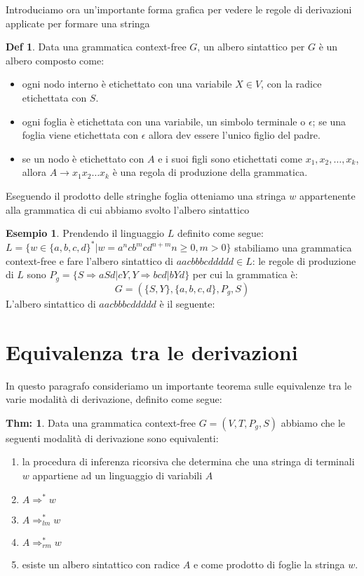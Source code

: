 \documentclass[a4paper]{report}
\theoremstyle{definition}%
\newtheorem*{defi}{Def}%
\newtheorem{thm}{Thm:}[chapter]
\newtheorem*{esempio}{Esempio}
\begin{document}
  Introduciamo ora un'importante forma grafica per vedere le regole di derivazioni applicate per formare una stringa
  \begin{defi}
    Data una grammatica context-free $G$, un albero sintattico per $G$ è un albero composto come:
    \begin{itemize}
       \item ogni nodo interno è etichettato con una variabile $X \in V$, con la radice etichettata con $S$.
       \item ogni foglia è etichettata con una variabile, un simbolo terminale o $\epsilon$; se una foglia viene etichettata
             con $\epsilon$ allora dev essere l'unico figlio del padre.
       \item se un nodo è etichettato con $A$ e i suoi figli sono etichettati come $x_1, x_2, \dots, x_k$, allora $A \to x_1x_2 \dots x_k$
             è una regola di produzione della grammatica.
    \end{itemize}
  \end{defi}
  Eseguendo il prodotto delle stringhe foglia otteniamo una stringa $w$ appartenente alla grammatica di cui abbiamo svolto l'albero sintattico
  
  \begin{esempio}
    Prendendo il linguaggio $L$ definito come segue:$L = \{w \in \{a,b,c,d\}^* | w = a^ncb^mcd^{n+m} n \geq 0,m > 0\}$
    stabiliamo una grammatica context-free e fare l'albero sintattico di $aacbbbcddddd \in L$:
    le regole di produzione di $L$ sono $P_g = \{S \Rightarrow aSd | cY, Y \Rightarrow bcd | bYd\}$ per cui la grammatica è:
    \begin{equation*}
      G = (\{S,Y\},\{a,b,c,d\},P_g,S)
    \end{equation*}
    L'albero sintattico di $aacbbbcddddd$ è il seguente:
    
  \end{esempio}

  \section{Equivalenza tra le derivazioni}
  In questo paragrafo consideriamo un importante teorema sulle equivalenze tra le varie modalità di derivazione, definito come segue:
  \begin{thm}
    Data una grammatica context-free $G = (V, T,P_g,S)$ abbiamo che le seguenti modalità di derivazione sono equivalenti:
    \begin{enumerate}
    \item la procedura di inferenza ricorsiva che determina che una stringa di terminali $w$ appartiene ad un linguaggio di variabili $A$
    \item $A \Rightarrow ^ * w$
    \item $A \Rightarrow _{lm} ^ * w$
    \item $A \Rightarrow _{rm} ^ * w$
    \item esiste un albero sintattico con radice $A$ e come prodotto di foglie la stringa $w$.
    \end{enumerate}
  \end{thm}
\end{document}
